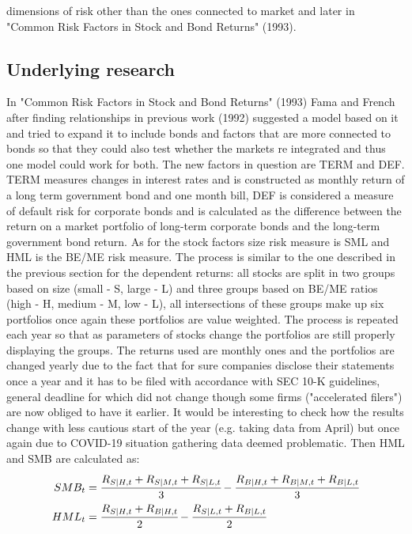 \documentclass[a4paper,12pt]{article} %
\begin{document}
dimensions of risk other than the ones connected to market and later in "Common Risk Factors in Stock and Bond Returns" (1993).
	
	\subsection{Underlying research}
	In "Common Risk Factors in Stock and Bond Returns" (1993) Fama and French after finding relationships in previous work (1992) suggested a model based on it and tried to expand it to include bonds and factors that are more connected to bonds so that they could also test whether the markets re integrated and thus one model could work for both. The new factors in question are TERM and DEF. TERM measures changes in interest rates and is constructed as monthly return of a long term government bond and one month bill, DEF is considered a measure of default risk for corporate bonds and is calculated as the difference between the return on a market portfolio of long-term corporate bonds and the long-term government bond
	return. As for the stock factors size risk measure is SML and HML is the BE/ME risk measure. The process is similar to the one described in the previous section for the dependent returns: all stocks are split in two groups based on size (small - S, large - L) and three groups based on BE/ME ratios (high - H, medium - M, low - L), all intersections of these groups make up six portfolios once again these portfolios are value weighted. The process is repeated each year so that as parameters of stocks change the portfolios are still properly displaying the groups. The returns used are monthly ones and the portfolios are changed yearly due to the fact that for sure companies disclose their statements once a year and it has to be filed with accordance with SEC 10-K\cite{K-10} guidelines, general deadline for which did not change though some firms ("accelerated filers") are now obliged to have it earlier. It would be interesting to check how the results change with less cautious start of the year (e.g. taking data from April) but once again due to COVID-19 situation gathering data deemed problematic. Then HML and SMB are calculated as:
	\begin{align}
	SMB_t &= \cfrac{R_{S|H, t} + R_{S|M, t} + R_{S|L, t}}{3} - \cfrac{R_{B|H, t} + R_{B|M, t} + R_{B|L, t}}{3} \\
	HML_t &= \cfrac{R_{S|H, t} + R_{B|H, t}}{2} - \cfrac{R_{S|L, t} + R_{B|L, t}}{2}
	\end{align}
\end{document}
